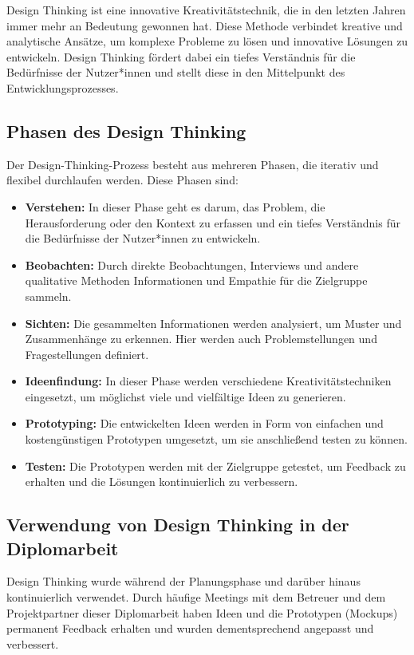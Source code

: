     Design Thinking \cite{DesignThinking} ist eine innovative Kreativitätstechnik, die in den letzten Jahren immer mehr an Bedeutung gewonnen hat. 
    Diese Methode verbindet kreative und analytische Ansätze, um komplexe Probleme zu lösen und innovative Lösungen zu entwickeln. 
    Design Thinking fördert dabei ein tiefes Verständnis für die Bedürfnisse der Nutzer*innen und stellt diese in den Mittelpunkt des Entwicklungsprozesses. 

   
    \subsection{Phasen des Design Thinking}

    Der Design-Thinking-Prozess besteht aus mehreren Phasen, die iterativ und flexibel durchlaufen werden. Diese Phasen sind:

    \begin{itemize}
        \item \textbf{Verstehen:} In dieser Phase geht es darum, das Problem, die Herausforderung oder den Kontext zu erfassen und ein tiefes Verständnis für die Bedürfnisse der Nutzer*innen zu entwickeln.
        \item \textbf{Beobachten:} Durch direkte Beobachtungen, Interviews und andere qualitative Methoden Informationen und Empathie für die Zielgruppe sammeln.
        \item \textbf{Sichten:} Die gesammelten Informationen werden analysiert, um Muster und Zusammenhänge zu erkennen. Hier werden auch Problemstellungen und Fragestellungen definiert.
        \item \textbf{Ideenfindung:} In dieser Phase werden verschiedene Kreativitätstechniken eingesetzt, um möglichst viele und vielfältige Ideen zu generieren.
        \item \textbf{Prototyping:} Die entwickelten Ideen werden in Form von einfachen und kostengünstigen Prototypen umgesetzt, um sie anschließend testen zu können.
        \item \textbf{Testen:} Die Prototypen werden mit der Zielgruppe getestet, um Feedback zu erhalten und die Lösungen kontinuierlich zu verbessern.
    \end{itemize}
    

    \subsection{Verwendung von Design Thinking in der Diplomarbeit}
    Design Thinking wurde während der Planungsphase und darüber hinaus kontinuierlich verwendet. 
    Durch häufige Meetings mit dem Betreuer und dem Projektpartner dieser Diplomarbeit haben Ideen und die Prototypen (Mockups) permanent Feedback erhalten und wurden dementsprechend angepasst und verbessert.

